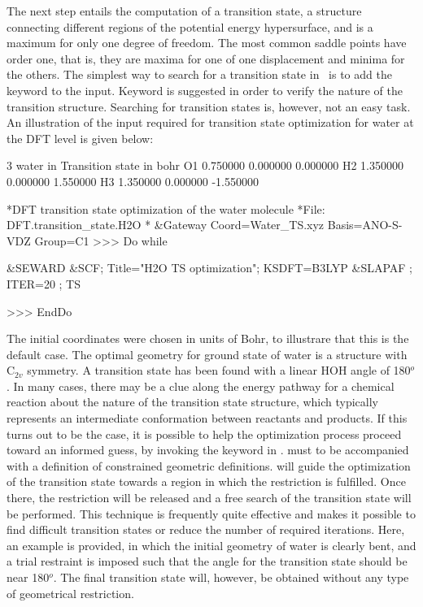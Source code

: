 The next step entails the computation of a transition state, a structure connecting different regions of
the potential energy hypersurface, and is a maximum for only one degree of
freedom. The most common saddle points have order one, that is, they are maxima for one of
one displacement and minima for the others. The simplest way to search for a 
transition state in \molcas\ is to add the keyword  to the 
 input. Keyword  is suggested in order to verify 
the nature of the transition structure. Searching for transition states is, 
however, not an easy task. An illustration of the input required for transition state optimization for water at the DFT level 
is given below:

\begin{inputlisting}
3
water in Transition state in bohr
O1             0.750000        0.000000        0.000000 
H2             1.350000        0.000000        1.550000 
H3             1.350000        0.000000       -1.550000 
\end{inputlisting}


\begin{inputlisting}
*DFT transition state optimization of the water molecule 
*File: DFT.transition_state.H2O
*
&Gateway
 Coord=Water_TS.xyz
 Basis=ANO-S-VDZ
 Group=C1
>>> Do while

 &SEWARD
 &SCF; Title="H2O TS optimization"; KSDFT=B3LYP
 &SLAPAF ; ITER=20 ; TS

>>> EndDo
\end{inputlisting}

The initial coordinates were chosen in units of Bohr, to illustrare that this is the
default case.  The optimal geometry for ground state of water is a structure with C$_{2v}$ symmetry. 
A transition state has been found with a linear HOH angle of 180$^o$. 
In many cases, there may be a clue along the energy pathway for a chemical reaction about the nature of the transition state structure, 
which typically represents an intermediate conformation between reactants and products. 
If this turns out to be the case, it is possible to help the optimization process 
proceed toward an informed guess, by invoking the keyword  in .
 must to be accompanied with a definition of constrained geometric definitions.
 will guide the optimization of the transition state towards a region in
which the restriction is fulfilled. Once there, the restriction will be released
and a free search of the transition state will be performed. This technique is 
frequently quite effective and makes it possible to find difficult transition 
states or reduce the number of required iterations. Here, an example is provided, in 
which the initial geometry of water is clearly bent, and a trial restraint is imposed
such that the angle for the transition state should be near 180$^o$. The 
final transition state will, however, be obtained without any type of geometrical restriction.

